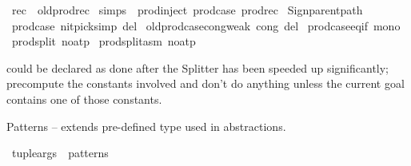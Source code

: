 \begin{isabellebody}
\ rec\ {\isacharequal}{\kern0pt}\ old{\isachardot}{\kern0pt}prod{\isachardot}{\kern0pt}rec\isanewline
{}\isamarkupfalse%
\ simps\ {\isacharequal}{\kern0pt}\ prod{\isachardot}{\kern0pt}inject\ prod{\isachardot}{\kern0pt}case\ prod{\isachardot}{\kern0pt}rec\isanewline
%
\isadelimML
\isanewline
%
\endisadelimML
%
\isatagML
{}\isamarkupfalse%
\ {\isacartoucheopen}Sign{\isachardot}{\kern0pt}parent{\isacharunderscore}{\kern0pt}path{\isacartoucheclose}%
\endisatagML
{\isafoldML}%
%
\isadelimML
\isanewline
%
\endisadelimML
\isanewline
{}\isamarkupfalse%
\ prod{\isachardot}{\kern0pt}case\ {\isacharbrackleft}{\kern0pt}nitpick{\isacharunderscore}{\kern0pt}simp\ del{\isacharbrackright}{\kern0pt}\isanewline
{}\isamarkupfalse%
\ old{\isachardot}{\kern0pt}prod{\isachardot}{\kern0pt}case{\isacharunderscore}{\kern0pt}cong{\isacharunderscore}{\kern0pt}weak\ {\isacharbrackleft}{\kern0pt}cong\ del{\isacharbrackright}{\kern0pt}\isanewline
{}\isamarkupfalse%
\ prod{\isachardot}{\kern0pt}case{\isacharunderscore}{\kern0pt}eq{\isacharunderscore}{\kern0pt}if\ {\isacharbrackleft}{\kern0pt}mono{\isacharbrackright}{\kern0pt}\isanewline
{}\isamarkupfalse%
\ prod{\isachardot}{\kern0pt}split\ {\isacharbrackleft}{\kern0pt}no{\isacharunderscore}{\kern0pt}atp{\isacharbrackright}{\kern0pt}\isanewline
{}\isamarkupfalse%
\ prod{\isachardot}{\kern0pt}split{\isacharunderscore}{\kern0pt}asm\ {\isacharbrackleft}{\kern0pt}no{\isacharunderscore}{\kern0pt}atp{\isacharbrackright}{\kern0pt}%
\begin{isamarkuptext}%
 could be declared as 
  done after the Splitter has been speeded up significantly;
  precompute the constants involved and don't do anything unless the
  current goal contains one of those constants.%
\end{isamarkuptext}\isamarkuptrue%
%
\isadelimdocument
%
\endisadelimdocument
%
\isatagdocument
%
\isamarkuptrue%
%
\endisatagdocument
{\isafolddocument}%
%
\isadelimdocument
%
\endisadelimdocument
%
\begin{isamarkuptext}%
Patterns -- extends pre-defined type  used in
  abstractions.%
\end{isamarkuptext}\isamarkuptrue%
\isamarkupfalse%
\ tuple{\isacharunderscore}{\kern0pt}args\ \ patterns\isanewline
{}\isamarkupfalse%

\end{isabellebody}
